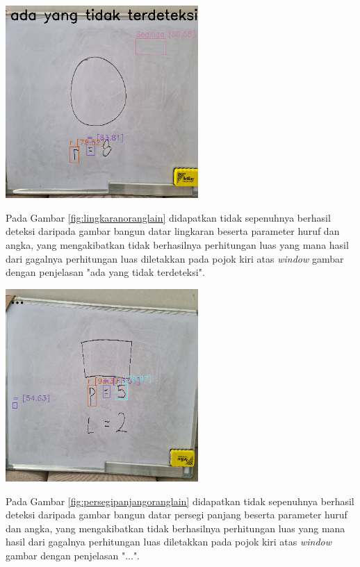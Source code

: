 \begin{center}
	\includegraphics[width=0.55\textwidth]{gambar/lingkaran orang.png}
	\label{fig:lingkaranoranglain}
\end{center}
Pada Gambar \ref{fig:lingkaranoranglain} didapatkan tidak sepenuhnya berhasil deteksi daripada gambar bangun datar lingkaran beserta parameter huruf dan angka, yang mengakibatkan tidak berhasilnya perhitungan luas yang mana hasil dari gagalnya perhitungan luas diletakkan pada pojok kiri atas \textit{window} gambar dengan penjelasan "ada yang tidak terdeteksi".

\begin{center}
	\includegraphics[width=0.55\textwidth]{gambar/persegipanjang orang.png}
	\label{fig:persegipanjangoranglain}
\end{center}
Pada Gambar \ref{fig:persegipanjangoranglain} didapatkan tidak sepenuhnya berhasil deteksi daripada gambar bangun datar persegi panjang beserta parameter huruf dan angka, yang mengakibatkan tidak berhasilnya perhitungan luas yang mana hasil dari gagalnya perhitungan luas diletakkan pada pojok kiri atas \textit{window} gambar dengan penjelasan "...".

